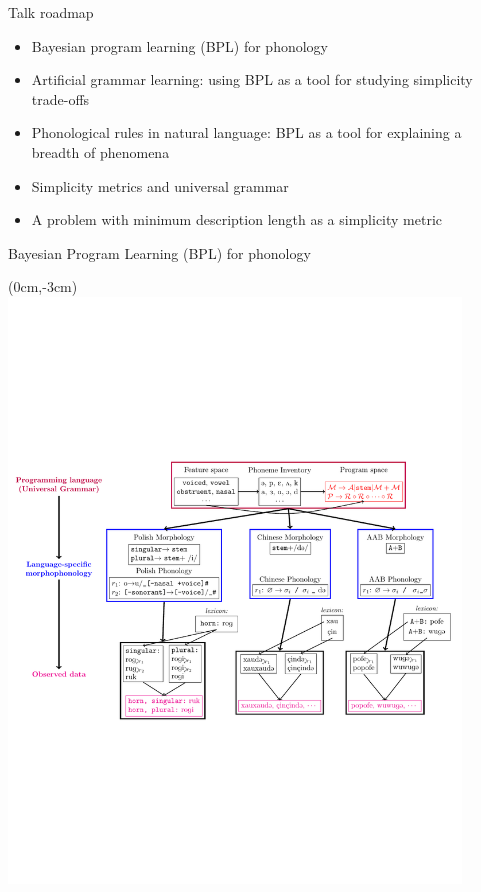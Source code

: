 \documentclass{beamer}
\begin{document}
\begin{frame}{Talk roadmap}

  \begin{itemize}
  \item Bayesian   program learning (BPL) for phonology
  \item Artificial grammar learning: using BPL as a tool for studying simplicity trade-offs
  \item Phonological rules in natural language: BPL as a tool for explaining a breadth of phenomena
  \item Simplicity metrics and universal grammar
  \item A problem with minimum description length as a simplicity metric
    \end{itemize}

  \end{frame}

\begin{frame}{Bayesian Program Learning (BPL) for phonology}
  \begin{textblock*}{5cm}(0cm,-3cm)
  \includegraphics[pages={1}, width=12cm]{generativeModel.pdf}    \end{textblock*}
\end{frame}
\end{document}
